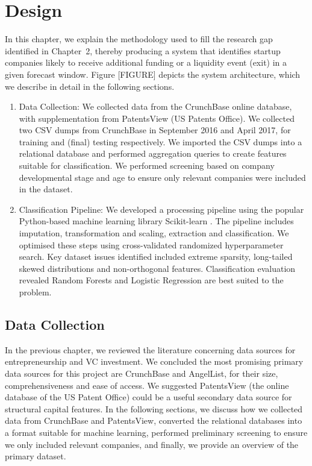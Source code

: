 \documentclass[../thesis/thesis.tex]{subfiles}
\begin{document}
\chapter{Design}
\label{chap:design}

In this chapter, we explain the methodology used to fill the research gap identified in Chapter~2, thereby producing a system that identifies startup companies likely to receive additional funding or a liquidity event (exit) in a given forecast window. Figure [FIGURE] depicts the system architecture, which we describe in detail in the following sections.

\begin{enumerate}

\item Data Collection: We collected data from the CrunchBase online database, with supplementation from PatentsView (US Patents Office). We collected two CSV dumps from CrunchBase in September 2016 and April 2017, for training and (final) testing respectively. We imported the CSV dumps into a relational database and performed aggregation queries to create features suitable for classification. We performed screening based on company developmental stage and age to ensure only relevant companies were included in the dataset.

\item Classification Pipeline: We developed a processing pipeline using the popular Python-based machine learning library Scikit-learn \cite{pedregosa2011}. The pipeline includes imputation, transformation and scaling, extraction and classification. We optimised these steps using cross-validated randomized hyperparameter search. Key dataset issues identified included extreme sparsity, long-tailed skewed distributions and non-orthogonal features. Classification evaluation revealed Random Forests and Logistic Regression are best suited to the problem.

\end{enumerate}

\section{Data Collection}

In the previous chapter, we reviewed the literature concerning data sources for entrepreneurship and VC investment. We concluded the most promising primary data sources for this project are CrunchBase and AngelList, for their size, comprehensiveness and ease of access. We suggested PatentsView (the online database of the US Patent Office) could be a useful secondary data source for structural capital features. In the following sections, we discuss how we collected data from CrunchBase and PatentsView, converted the relational databases into a format suitable for machine learning, performed preliminary screening to ensure we only included relevant companies, and finally, we provide an overview of the primary dataset.
\end{document}
